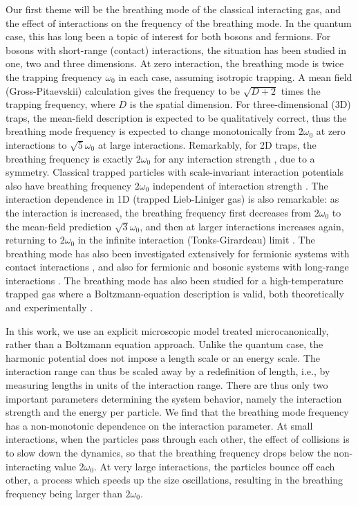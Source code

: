 \documentclass[a4paper, onecolumn]{revtex4-1}
\begin{document}
Our first theme will be the breathing mode of the classical interacting gas, and the effect of
interactions on the frequency of the breathing mode.  In the quantum case, this has long been a
topic of interest for both bosons and fermions.  For bosons with short-range (contact) interactions,
the situation has been studied in one, two and three dimensions.  At zero interaction, the breathing
mode is twice the trapping frequency $\omega_0$ in each case, assuming isotropic trapping.  A mean
field (Gross-Pitaevskii) calculation gives the frequency to be $\sqrt{D+2}$ times the trapping
frequency, where $D$ is the spatial dimension.  For three-dimensional (3D) traps, the mean-field
description is expected to be qualitatively correct, thus the breathing mode frequency is expected
to change monotonically from $2\omega_0$ at zero interactions to $\sqrt{5}\omega_0$ at large
interactions.  Remarkably, for 2D traps, the breathing frequency is exactly $2\omega_0$ for any
interaction strength \cite{PitaevskiiRosch_PRA97}, due to a symmetry.  Classical trapped particles
with scale-invariant interaction potentials also have breathing frequency $2\omega_0$ independent of
interaction strength \cite{PitaevskiiRosch_PRA97}.  The interaction dependence in 1D (trapped
Lieb-Liniger gas) is also remarkable: as the interaction is increased, the breathing frequency first
decreases from $2\omega_0$ to the mean-field prediction $\sqrt{3}\omega_0$, and then at larger
interactions increases again, returning to $2\omega_0$ in the infinite interaction (Tonks-Girardeau)
limit \cite{Naegerl_Science09, Tschischik_BHbreathing_PRA_2013, 1D_breathing_mode_recent,
  Bouchoule_PRL2014, KroenkeSchmelcher_BM}.
%
The breathing mode has also been investigated extensively for fermionic systems with contact
interactions \cite{GrimmSmith_unitaryfermions_PRA08, fermion2Dbreathing,
  Stringari_lowDcollective_PRA15}, and also for fermionic and bosonic systems with long-range
interactions \cite{OrignacCitro_PRA08, br_mode_long_range_interactions, Bonitz_Review}.  The
breathing mode has also been studied for a high-temperature trapped gas where a Boltzmann-equation
description is valid, both theoretically \cite{Guery-Odelin1999} and experimentally
\cite{Cornell_classsical_3Dexpt_NatPhys15}.

In this work, we use an explicit microscopic model treated microcanonically, rather than a Boltzmann
equation approach.  Unlike the quantum case, the harmonic potential does not impose a length scale
or an energy scale.  The interaction range can thus be scaled away by a redefinition of length,
i.e., by measuring lengths in units of the interaction range.  There are thus only two important
parameters determining the system behavior, namely the interaction strength and the energy per
particle.  We find that the breathing mode frequency has a non-monotonic dependence on the
interaction parameter.  At small interactions, when the particles pass through each other, the
effect of collisions is to slow down the dynamics, so that the breathing frequency drops below the
non-interacting value $2\omega_0$.  At very large interactions, the particles bounce off each other,
a process which speeds up the size oscillations, resulting in the breathing frequency being larger
than $2\omega_0$.
\end{document}
